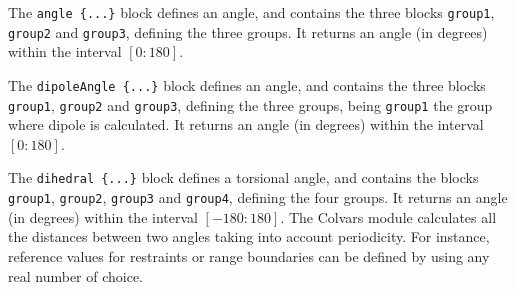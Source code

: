 


The \texttt{angle~\{...\}} block defines an angle, and contains the
three blocks \texttt{group1}, \texttt{group2} and \texttt{group3}, defining
the three groups.  It returns an angle (in degrees) within the
interval $[0:180]$.

\begin{cvcoptions}
\item %
\item %
\item %
\item %
\end{cvcoptions}




The \texttt{dipoleAngle~\{...\}} block defines an angle, and contains the
three blocks \texttt{group1}, \texttt{group2} and \texttt{group3}, defining
the three groups, being \texttt{group1} the group where dipole is calculated.
It returns an angle (in degrees) within the interval $[0:180]$.

\begin{cvcoptions}
\item %
\item %
\item %
\item %
\end{cvcoptions}



The \texttt{dihedral~\{...\}} block defines a torsional angle, and
contains the blocks \texttt{group1}, \texttt{group2}, \texttt{group3}
and \texttt{group4}, defining the four groups.  It returns an angle
(in degrees) within the interval $[-180:180]$.  The Colvars module
calculates all the distances between two angles taking into account
periodicity.  For instance, reference values for restraints or range
boundaries can be defined by using any real number of choice.

